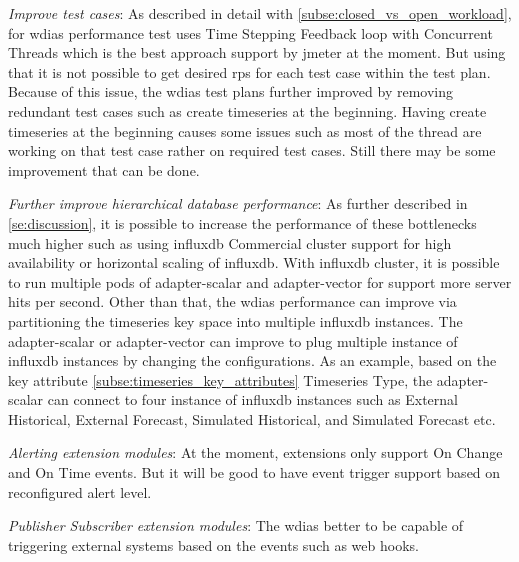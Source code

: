\emph{Improve test cases}:
As described in detail with \cref{subse:closed_vs_open_workload}, for \acrshort{wdias} performance test uses Time Stepping Feedback loop with Concurrent Threads which is the best approach support by \acrshort{jmeter} at the moment. But using that it is not possible to get desired \acrshort{rps} for each test case within the test plan.
Because of this issue, the \acrshort{wdias} test plans further improved by removing redundant test cases such as create timeseries at the beginning. Having create timeseries at the beginning causes some issues such as most of the thread are working on that test case rather on required test cases. Still there may be some improvement that can be done. 

\emph{Further improve hierarchical database performance}:
As further described in \cref{se:discussion}, it is possible to increase the performance of these bottlenecks much higher such as using \acrshort{influxdb} Commercial cluster support for high availability or horizontal scaling of \acrshort{influxdb}. With \acrshort{influxdb} cluster, it is possible to run multiple pods of adapter-scalar and adapter-vector for support more server hits per second.
Other than that, the \acrshort{wdias} performance can improve via partitioning the timeseries key space into multiple \acrshort{influxdb} instances. The adapter-scalar or adapter-vector can improve to plug multiple instance of \acrshort{influxdb} instances by changing the configurations. As an example, based on the key attribute \cref{subse:timeseries_key_attributes} Timeseries Type, the adapter-scalar can connect to four instance of \acrshort{influxdb} instances such as  External Historical, External Forecast, Simulated Historical, and Simulated Forecast etc.

\emph{Alerting extension modules}:
At the moment, extensions only support On Change and On Time events. But it will be good to have event trigger support based on reconfigured alert level.

\emph{Publisher Subscriber extension modules}:
The \acrshort{wdias} better to be capable of triggering external systems based on the events such as web hooks.

